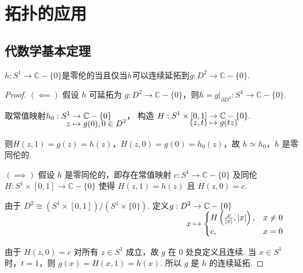 \chapter{拓扑的应用}

\section{代数学基本定理}

\begin{lemma}[][lem:11.1]
    $h:S^1\to \mathbb{C}-\{0\}$是零伦的当且仅当$h$可以连续延拓到$g: D^2 \to \mathbb{C}-\{0\}$.
\end{lemma}
\begin{proof}
    $(\impliedby)$
    假设 $h$ 可延拓为 $g: D^2 \to \mathbb{C}-\{0\}$，则$h = g|_{\partial D^2}: S^1 \to \mathbb{C}-\{0\}$.\par
    取常值映射$\setjot[-4]\begin{aligned}[t]
        h_0: S^1 &\to \mathbb{C}-\{0\} \\
        z &\mapsto g(0),0 \in D^2
    \end{aligned}$，
    构造 $\setjot[-4]\begin{aligned}[t]
        H: S^1 \times [0, 1] &\to \mathbb{C}-\{0\} \\
        (z, t) &\mapsto g(tz)
    \end{aligned}$.\par
    则$H(z, 1)=g(z)=h(z)$，$H(z, 0)=g(0)=h_0(z)$，故 $h \simeq h_0$，$h$ 是零同伦的.\par
    $(\implies)$
    假设 $h$ 是零同伦的，即存在常值映射 $c: S^1 \to \mathbb{C}-\{0\}$ 及同伦 $H: S^1 \times [0, 1] \longrightarrow \mathbb{C}-\{0\}$ 使得 $H(z, 1) = h(z)$ 且 $H(z, 0) = c$.
    
    由于 $D^2 \cong (S^1 \times [0, 1]) / (S^1 \times \{0\})$.
    定义$\setjot[-2]\begin{aligned}[t]
        g: D^2 &\to \mathbb{C}-\{0\} \\
        x &\mapsto\begin{cases}
            H\left(\frac{x}{|x|}, |x|\right),&x\neq 0 \\
            c,&x=0
        \end{cases}
    \end{aligned}$\par
    由于 $H(z, 0) = c$ 对所有 $z \in S^1$ 成立，故 $g$ 在 $0$ 处良定义且连续.
    当 $x \in S^1$ 时，$t=1$，则 $g(x) = H(x, 1) = h(x)$.
    所以 $g$ 是 $h$ 的连续延拓.
\end{proof}

